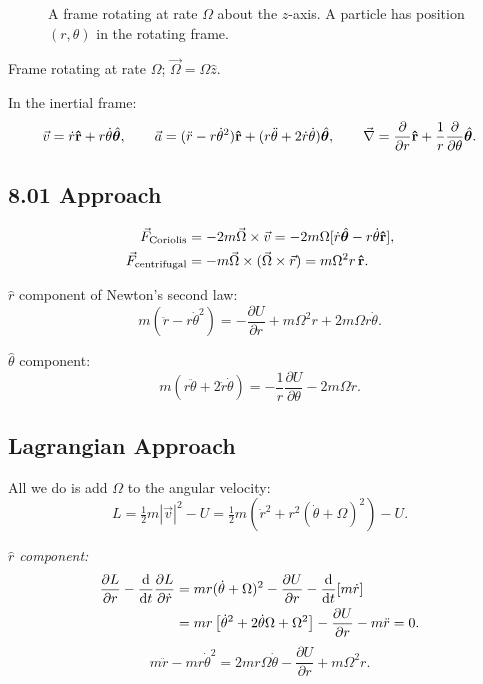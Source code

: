 \begin{figure}[H]
    \centering
    \caption{A frame rotating at rate $\Omega$ about the $z$-axis. A particle has
    position $(r,\theta)$ in the rotating frame.}
\end{figure}

Frame rotating at rate $\Omega$; $\vec{\Omega} = \Omega\hat{z}$.

In the inertial frame:
\[
    \vec{v} = \dot{r}\boldsymbol{\hat{\textbf{r}}} + r\dot{\theta}\hat{\boldsymbol{\theta}}, \qquad
    \vec{a} = (\ddot{r} - r\dot{\theta}^2)\boldsymbol{\hat{\textbf{r}}}
            + (r\ddot{\theta} + 2\dot{r}\dot{\theta})\hat{\boldsymbol{\theta}}, \qquad
    \vec{\nabla} = \frac{\partial}{\partial r}\boldsymbol{\hat{\textbf{r}}} + \frac{1}{r}\frac{\partial}{\partial\theta}\hat{\boldsymbol{\theta}}.
\]

\subsection{8.01 Approach}

\begin{align*}
    \vec{F}_\text{Coriolis}   &= -2m\vec{\Omega}\times\vec{v}
        = -2m\Omega[\dot{r}\hat{\boldsymbol{\theta}} - r\dot{\theta}\boldsymbol{\hat{\textbf{r}}}], \\
    \vec{F}_\text{centrifugal} &= -m\vec{\Omega}\times(\vec{\Omega}\times\vec{r})
        = m\Omega^2 r\,\boldsymbol{\hat{\textbf{r}}}.
\end{align*}

$\hat{r}$ component of Newton's second law:
\[
    m(\ddot{r} - r\dot{\theta}^2) = -\frac{\partial U}{\partial r} + m\Omega^2 r + 2m\Omega r\dot{\theta}.
\]

$\hat{\theta}$ component:
\[
    m(r\ddot{\theta} + 2\dot{r}\dot{\theta}) = -\frac{1}{r}\frac{\partial U}{\partial\theta} - 2m\Omega\dot{r}.
\]

\subsection{Lagrangian Approach}

All we do is add $\Omega$ to the angular velocity:
\[
    L = \tfrac{1}{2}m|\vec{v}|^2 - U
    = \tfrac{1}{2}m\!\left(\dot{r}^2 + r^2(\dot{\theta}+\Omega)^2\right) - U.
\]

\textit{$\hat{r}$ component:}
\begin{align*}
    \frac{\partial L}{\partial r} - \dv{t}\frac{\partial L}{\partial \dot{r}}
    &= mr(\dot{\theta}+\Omega)^2 - \frac{\partial U}{\partial r} - \dv{t}[m\dot{r}] \\
    &= mr\left[\dot{\theta}^2 + 2\dot{\theta}\Omega + \Omega^2\right]
       - \frac{\partial U}{\partial r} - m\ddot{r} = 0.
\end{align*}
\[
    \boxed{m\ddot{r} - mr\dot{\theta}^2 = 2mr\Omega\dot{\theta} - \frac{\partial U}{\partial r} + m\Omega^2 r.}
    \tag{1}
\]

